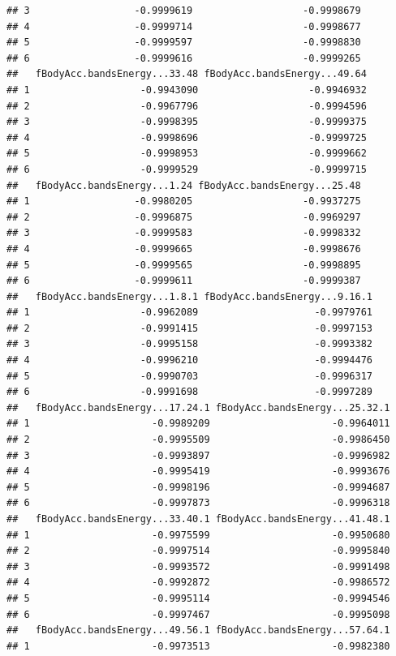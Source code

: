\documentclass[
]{article}
\begin{document}
\begin{verbatim}
## 3                  -0.9999619                   -0.9998679
## 4                  -0.9999714                   -0.9998677
## 5                  -0.9999597                   -0.9998830
## 6                  -0.9999616                   -0.9999265
##   fBodyAcc.bandsEnergy...33.48 fBodyAcc.bandsEnergy...49.64
## 1                   -0.9943090                   -0.9946932
## 2                   -0.9967796                   -0.9994596
## 3                   -0.9998395                   -0.9999375
## 4                   -0.9998696                   -0.9999725
## 5                   -0.9998953                   -0.9999662
## 6                   -0.9999529                   -0.9999715
##   fBodyAcc.bandsEnergy...1.24 fBodyAcc.bandsEnergy...25.48
## 1                  -0.9980205                   -0.9937275
## 2                  -0.9996875                   -0.9969297
## 3                  -0.9999583                   -0.9998332
## 4                  -0.9999665                   -0.9998676
## 5                  -0.9999565                   -0.9998895
## 6                  -0.9999611                   -0.9999387
##   fBodyAcc.bandsEnergy...1.8.1 fBodyAcc.bandsEnergy...9.16.1
## 1                   -0.9962089                    -0.9979761
## 2                   -0.9991415                    -0.9997153
## 3                   -0.9995158                    -0.9993382
## 4                   -0.9996210                    -0.9994476
## 5                   -0.9990703                    -0.9996317
## 6                   -0.9991698                    -0.9997289
##   fBodyAcc.bandsEnergy...17.24.1 fBodyAcc.bandsEnergy...25.32.1
## 1                     -0.9989209                     -0.9964011
## 2                     -0.9995509                     -0.9986450
## 3                     -0.9993897                     -0.9996982
## 4                     -0.9995419                     -0.9993676
## 5                     -0.9998196                     -0.9994687
## 6                     -0.9997873                     -0.9996318
##   fBodyAcc.bandsEnergy...33.40.1 fBodyAcc.bandsEnergy...41.48.1
## 1                     -0.9975599                     -0.9950680
## 2                     -0.9997514                     -0.9995840
## 3                     -0.9993572                     -0.9991498
## 4                     -0.9992872                     -0.9986572
## 5                     -0.9995114                     -0.9994546
## 6                     -0.9997467                     -0.9995098
##   fBodyAcc.bandsEnergy...49.56.1 fBodyAcc.bandsEnergy...57.64.1
## 1                     -0.9973513                     -0.9982380

\end{verbatim}
\end{document}
